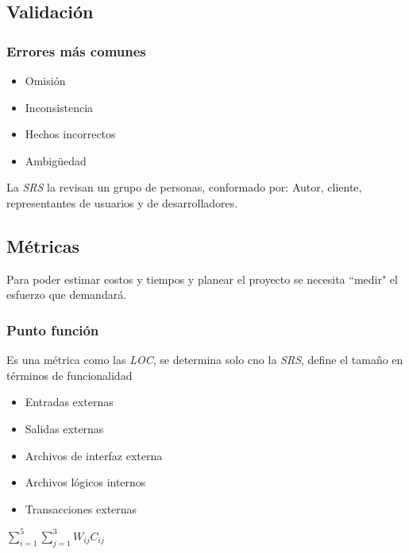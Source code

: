   \subsection{Validación}

    \subsubsection{Errores más comunes}
      \begin{itemize}
        \item Omisión
        \item Inconsistencia
        \item Hechos incorrectos
        \item Ambigüedad
      \end{itemize}
      La \textit{SRS} la revisan un grupo de personas, conformado por: Autor, cliente, representantes de usuarios y de 
      desarrolladores.

  \subsection{Métricas}
    Para poder estimar costos y tiempos y planear el proyecto se necesita ``medir" el esfuerzo que demandará.

    \subsubsection{Punto función}
      Es una métrica como las \textit{LOC}, se determina solo cno la \textit{SRS}, define el tamaño en términos de
      funcionalidad

      \begin{itemize}
        \item Entradas externas
        \item Salidas externas
        \item Archivos de interfaz externa
        \item Archivos lógicos internos
        \item Transacciones externas
      \end{itemize}

       \quad $\sum\limits_{i=1}^{5}\sum\limits_{j=1}^{3}W_{ij}C_{ij}$

